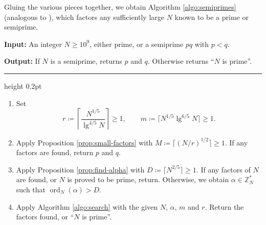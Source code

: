 \documentclass[reqno]{amsart}
\theoremstyle{remark}
\numberwithin{equation}{section}
\numberwithin{thm}{section}
\newcommand{\ZZ}{\mathbb{Z}}
\renewcommand{\geq}{\geqslant}
\newcommand{\defeq}{\coloneqq}
\DeclareMathOperator{\ord}{ord}
\begin{document}
Gluing the various pieces together,
we obtain Algorithm \ref{algo:semiprimes}
(analogous to \cite[Algorithm 6.1]{Hit-timespace}),
which factors any sufficiently large $N$ known to be a prime or semiprime.
\begin{myalgorithm}[ht]
\caption{-- factoring (semi)primes}
\label{algo:semiprimes}
  \begin{flushleft}
  \textbf{Input:} An integer $N \geq 10^9$,
  either prime, or a semiprime $pq$ with $p < q$.

  \textbf{Output:} If $N$ is a semiprime, returns $p$ and $q$. Otherwise returns ``$N$ is prime''.
  \end{flushleft}
  \vspace{2pt} \hrule height 0.2pt \vspace{1pt}
  \begin{enumerate}[label=\arabic*),labelwidth=0.7cm,leftmargin=\labelwidth,itemsep=0.2em]
    \item
    Set
      \[ r \defeq \left\lceil \frac{N^{1/5}}{\lg^{4/5} N} \right\rceil \geq 1, \qquad
	 m \defeq \lceil N^{1/5} \lg^{6/5} N \rceil \geq 1. \]
    
    \item 
    Apply Proposition \ref{prop:small-factors} with
    $M \defeq \lceil (N / r)^{1/2} \rceil \geq 1$.
    If any factors are found, return $p$ and $q$.
    
    \item
    Apply Proposition \ref{prop:find-alpha} with
    $D \defeq \lceil N^{2/5} \rceil \geq 1$.
    If any factors of $N$ are found, or $N$ is proved to be prime, return.
    Otherwise, we obtain $\alpha \in \ZZ_N^*$ such that $\ord_N(\alpha) > D$.

    \item
    Apply Algorithm \ref{algo:search} with the given $N$, $\alpha$, $m$ and $r$.
    Return the factors found, or ``$N$ is prime''.
\end{enumerate}
\end{myalgorithm}
\end{document}
